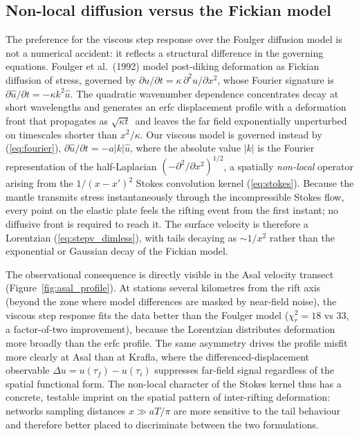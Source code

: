 \documentclass[12pt]{article}
\begin{document}
\subsection{Non-local diffusion versus the Fickian model}
\label{sec:disc_nonlocal}

The preference for the viscous step response over the Foulger diffusion model
is not a numerical accident: it reflects a structural difference in the
governing equations.  Foulger et al.\ (1992) model post-diking deformation as
Fickian diffusion of stress, governed by $\partial u/\partial t =
\kappa\,\partial^2 u/\partial x^2$, whose Fourier signature is
$\partial\hat{u}/\partial t = -\kappa k^2\hat{u}$.  The quadratic wavenumber
dependence concentrates decay at short wavelengths and generates an erfc
displacement profile with a deformation front that propagates as
$\sqrt{\kappa t}$~and leaves the far field exponentially unperturbed on
timescales shorter than $x^2/\kappa$.  Our viscous model is governed instead
by (\ref{eq:fourier}), $\partial\hat{u}/\partial t = -a|k|\hat{u}$, where the
absolute value $|k|$ is the Fourier representation of the half-Laplacian
$(-\partial^2/\partial x^2)^{1/2}$, a spatially \emph{non-local} operator
arising from the $1/(x-x')^2$ Stokes convolution kernel (\ref{eq:stokes}).
Because the mantle transmits stress instantaneously through the incompressible
Stokes flow, every point on the elastic plate feels the rifting event from the
first instant; no diffusive front is required to reach it.  The surface
velocity is therefore a Lorentzian (\ref{eq:stepv_dimless}), with tails
decaying as $\sim 1/x^2$ rather than the exponential or Gaussian decay of the
Fickian model.

The observational consequence is directly visible in the Asal velocity
transect (Figure~\ref{fig:asal_profile}).  At stations several kilometres from
the rift axis (beyond the zone where model differences are masked by
near-field noise), the viscous step response fits the data better than the
Foulger model ($\chi^2_r = 18$ vs $33$, a factor-of-two improvement), because
the Lorentzian distributes deformation more broadly than the erfc profile.
The same asymmetry drives the profile misfit more clearly at Asal than at
Krafla, where the differenced-displacement observable
$\Delta u = u(\tau_f) - u(\tau_i)$ suppresses far-field signal regardless of
the spatial functional form.  The non-local character of the Stokes kernel
thus has a concrete, testable imprint on the spatial pattern of inter-rifting
deformation: networks sampling distances $x \gg aT/\pi$ are more sensitive to
the tail behaviour and therefore better placed to discriminate between the two
formulations.
\end{document}
